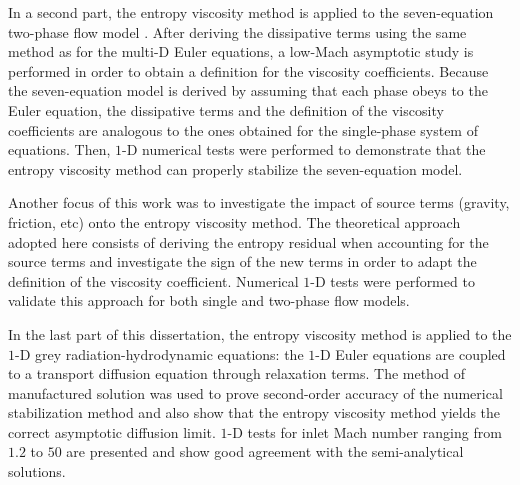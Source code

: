 In a second part, the entropy viscosity method is applied to the seven-equation two-phase flow model \cite{SEM}. After deriving the dissipative terms using the same method as for the multi-D Euler equations, a low-Mach asymptotic study is performed in order to obtain a definition for the viscosity coefficients. Because the seven-equation model is derived by assuming that each phase obeys to the Euler equation, the dissipative terms and the definition of the viscosity coefficients are analogous to the ones obtained for the single-phase system of equations. Then, $1$-D numerical tests were performed to demonstrate that the entropy viscosity method can properly stabilize the seven-equation model.

Another focus of this work was to investigate the impact of source terms (gravity, friction, etc) onto the entropy viscosity method. The theoretical approach adopted here consists of deriving the entropy residual when accounting for the source terms and investigate the sign of the new terms in order to adapt the definition of the viscosity coefficient. Numerical $1$-D tests were performed to validate this approach for both single and two-phase flow models.

In the last part of this dissertation, the entropy viscosity method is applied to the $1$-D grey radiation-hydrodynamic equations: the $1$-D Euler equations are coupled to a transport diffusion equation through relaxation terms. The method of manufactured solution was used to prove second-order accuracy of the numerical stabilization method and also show that the entropy viscosity method yields the correct asymptotic diffusion limit. $1$-D tests for inlet Mach number ranging from $1.2$ to $50$ are presented and show good agreement with the semi-analytical solutions.  
\pagebreak{}
